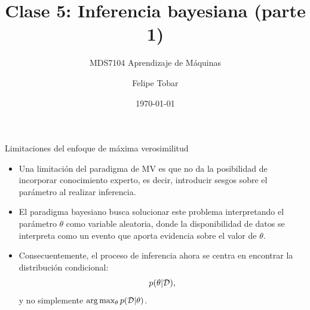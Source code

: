 \documentclass[9pt, handout]{beamer}
\title{Clase 5: Inferencia bayesiana (parte 1)}
\subtitle{MDS7104 Aprendizaje de Máquinas}
\date{\today}
\author{Felipe Tobar}
\institute{Iniciativa de Datos e Inteligencia Artificial\\Universidad de Chile}
\begin{document}
\begin{frame}
  \titlepage
\end{frame}

\begin{frame}{Limitaciones del enfoque de máxima verosimilitud}

\begin{itemize}
	\setlength\itemsep{2em}
	\item Una limitación del paradigma de MV es que no da la posibilidad de incorporar conocimiento experto, es decir, introducir sesgos sobre el parámetro al realizar inferencia.\pause
	\item El paradigma bayesiano busca solucionar este problema interpretando el parámetro $\theta$ como variable aleatoria, donde la disponibilidad de datos se interpreta como un evento que aporta evidencia sobre el valor de $\theta$.\pause
	\item Consecuentemente, el proceso de inferencia ahora se centra en encontrar la distribución condicional:
	\begin{equation*}
		p(\theta|{\mathcal D}),
	\end{equation*}
	y no simplemente $\arg\max_{\theta} p({\mathcal D}|\theta)$.
\end{itemize}

\end{frame}
\end{document}
